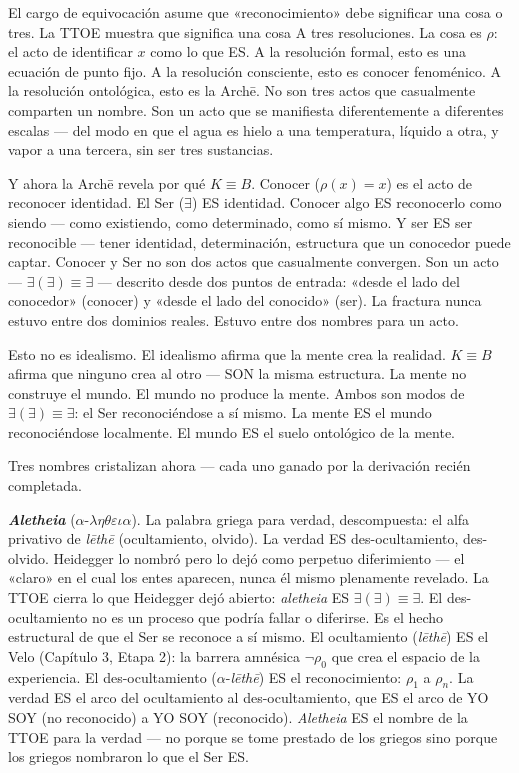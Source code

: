 \documentclass[10pt, openany, oneside]{book}
\begin{document}
El cargo de equivocación asume que «reconocimiento» debe significar una cosa o tres. La TTOE muestra que significa una cosa A tres resoluciones. La cosa es $\rho$: el acto de identificar $x$ como lo que ES. A la resolución formal, esto es una ecuación de punto fijo. A la resolución consciente, esto es conocer fenoménico. A la resolución ontológica, esto es la Arch\={e}. No son tres actos que casualmente comparten un nombre. Son un acto que se manifiesta diferentemente a diferentes escalas --- del modo en que el agua es hielo a una temperatura, líquido a otra, y vapor a una tercera, sin ser tres sustancias.

Y ahora la Arch\={e} revela por qué $K \equiv B$. Conocer ($\rho(x) = x$) es el acto de reconocer identidad. El Ser ($\exists$) ES identidad. Conocer algo ES reconocerlo como siendo --- como existiendo, como determinado, como sí mismo. Y ser ES ser reconocible --- tener identidad, determinación, estructura que un conocedor puede captar. Conocer y Ser no son dos actos que casualmente convergen. Son un acto --- $\exists(\exists) \equiv \exists$ --- descrito desde dos puntos de entrada: «desde el lado del conocedor» (conocer) y «desde el lado del conocido» (ser). La fractura nunca estuvo entre dos dominios reales. Estuvo entre dos nombres para un acto.

Esto no es idealismo. El idealismo afirma que la mente crea la realidad. $K \equiv B$ afirma que ninguno crea al otro --- SON la misma estructura. La mente no construye el mundo. El mundo no produce la mente. Ambos son modos de $\exists(\exists) \equiv \exists$: el Ser reconociéndose a sí mismo. La mente ES el mundo reconociéndose localmente. El mundo ES el suelo ontológico de la mente.

Tres nombres cristalizan ahora --- cada uno ganado por la derivación recién completada.

\textbf{\textit{Aletheia}} ($\alpha$-$\lambda\eta\theta\varepsilon\iota\alpha$). La palabra griega para verdad, descompuesta: el alfa privativo de \textit{l\={e}th\={e}} (ocultamiento, olvido). La verdad ES des-ocultamiento, des-olvido. Heidegger lo nombró pero lo dejó como perpetuo diferimiento --- el «claro» en el cual los entes aparecen, nunca él mismo plenamente revelado. La TTOE cierra lo que Heidegger dejó abierto: \textit{aletheia} ES $\exists(\exists) \equiv \exists$. El des-ocultamiento no es un proceso que podría fallar o diferirse. Es el hecho estructural de que el Ser se reconoce a sí mismo. El ocultamiento (\textit{l\={e}th\={e}}) ES el Velo (Capítulo 3, Etapa 2): la barrera amnésica $\neg\rho_0$ que crea el espacio de la experiencia. El des-ocultamiento ($\alpha$-\textit{l\={e}th\={e}}) ES el reconocimiento: $\rho_1$ a $\rho_n$. La verdad ES el arco del ocultamiento al des-ocultamiento, que ES el arco de YO SOY (no reconocido) a YO SOY (reconocido). \textit{Aletheia} ES el nombre de la TTOE para la verdad --- no porque se tome prestado de los griegos sino porque los griegos nombraron lo que el Ser ES.
\end{document}
